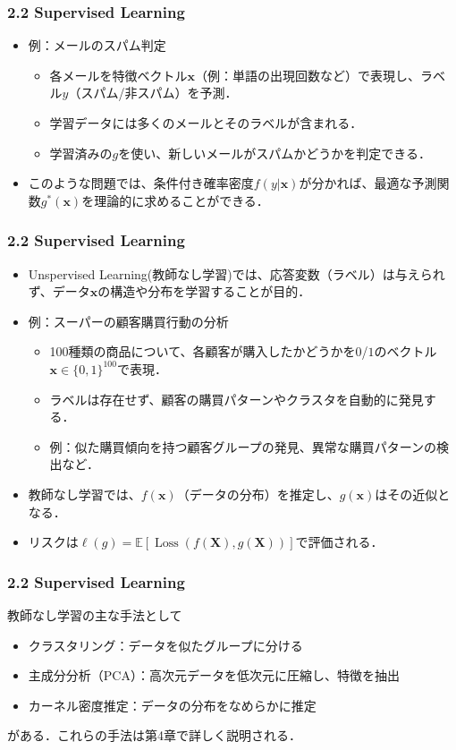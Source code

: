 \documentclass[dvipdfmx,cjk]{beamer}
\theoremstyle{example}
\DeclareMathOperator{\Loss}{Loss}
\begin{document}
\begin{frame}
    \frametitle{2.2 Supervised Learning}
    \begin{itemize}
        \item 例：メールのスパム判定
              \begin{itemize}
                  \item 各メールを特徴ベクトル$\boldsymbol{x}$（例：単語の出現回数など）で表現し、ラベル$y$（スパム/非スパム）を予測．
                  \item 学習データには多くのメールとそのラベルが含まれる．
                  \item 学習済みの$g$を使い、新しいメールがスパムかどうかを判定できる．
              \end{itemize}
        \item このような問題では、条件付き確率密度$f(y|\boldsymbol{x})$が分かれば、最適な予測関数$g^*(\boldsymbol{x})$を理論的に求めることができる．
    \end{itemize}
\end{frame}

\begin{frame}
    \frametitle{2.2 Supervised Learning}
    \begin{itemize}
        \item Unspervised Learning(教師なし学習)では、応答変数（ラベル）は与えられず、データ$\boldsymbol{x}$の構造や分布を学習することが目的．
        \item 例：スーパーの顧客購買行動の分析
              \begin{itemize}
                  \item 100種類の商品について、各顧客が購入したかどうかを$0$/$1$のベクトル$\boldsymbol{x} \in \{0,1\}^{100}$で表現．
                  \item ラベルは存在せず、顧客の購買パターンやクラスタを自動的に発見する．
                  \item 例：似た購買傾向を持つ顧客グループの発見、異常な購買パターンの検出など．
              \end{itemize}
        \item 教師なし学習では、$f(\boldsymbol{x})$（データの分布）を推定し、$g(\boldsymbol{x})$はその近似となる．
        \item リスクは$\ell(g) = \mathbb{E}[\Loss(f(\boldsymbol{X}), g(\boldsymbol{X}))]$で評価される．
    \end{itemize}
\end{frame}

\begin{frame}
    \frametitle{2.2 Supervised Learning}
    教師なし学習の主な手法として
    \begin{itemize}
        \item クラスタリング：データを似たグループに分ける
        \item 主成分分析（PCA）：高次元データを低次元に圧縮し、特徴を抽出
        \item カーネル密度推定：データの分布をなめらかに推定
    \end{itemize}
    がある．これらの手法は第4章で詳しく説明される．
\end{frame}
\end{document}
